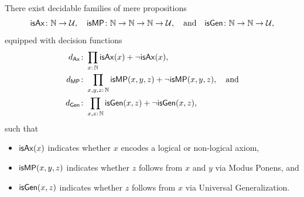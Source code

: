 \begin{prop}\label{prop:decidable-rules}
    There exist decidable families of mere propositions
    \[
        \fun{isAx}\colon\N\to\univ,\quad
        \fun{isMP}\colon\N\to\N\to\N\to\univ,
        \quad\text{and}\quad
        \fun{isGen}\colon\N\to\N\to\univ,
    \]
    equipped with decision functions
    \begin{align*}
        d_{\fun{Ax}}&\colon\prod_{x\colon\N}\fun{isAx}(x)+\neg\fun{isAx}(x),\\
        d_{\fun{MP}}&\colon\prod_{x,y,z\colon\N}\fun{isMP}(x,y,z)+\neg\fun{isMP}(x,y,z),\quad\text{and}\\
        d_{\fun{Gen}}&\colon\prod_{x,z\colon\N}\fun{isGen}(x,z)+\neg\fun{isGen}(x,z),
    \end{align*}
    such that
    \begin{itemize}
        \item $\mathsf{isAx}(x)$ indicates whether $x$ encodes a logical or non-logical axiom,
        \item $\mathsf{isMP}(x,y,z)$ indicates whether $z$ follows from $x$ and $y$ via Modus Ponens, and
        \item $\mathsf{isGen}(x,z)$ indicates whether $z$ follows from $x$ via Universal Generalization.
    \end{itemize}
\end{prop}


